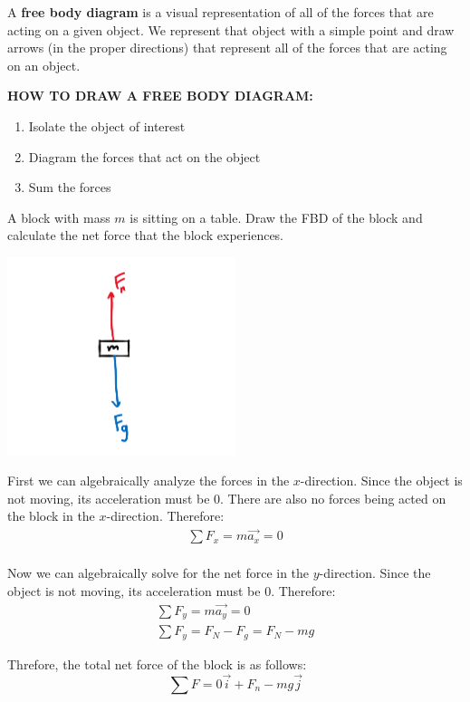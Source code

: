 A \textbf{free body diagram} is a visual representation of all of the forces that are acting on a given object. We represent that object with a simple point and draw arrows (in the proper directions) that represent all of the forces that are acting on an object.\\

\begin{center}\textbf{HOW TO DRAW A FREE BODY DIAGRAM:}\end{center}
\begin{enumerate}
	\item Isolate the object of interest
	\item Diagram the forces that act on the object
	\item Sum the forces
\end{enumerate}

\begin{problem}
	A block with mass $m$ is sitting on a table. Draw the FBD of the block and calculate the net force that the block experiences.

	\begin{center}
		\includegraphics[width=0.5\textwidth]{chapters/ch3/images/fig3_1.PNG}
	\end{center}
	First we can algebraically analyze the forces in the $x$-direction. Since the object is not moving, its acceleration must be 0. There are also no forces being acted on the block in the $x$-direction. Therefore:
	$$
		\begin{aligned}
			\sum F_x = m\vec{a_x} = 0\\
		\end{aligned}
	$$

	Now we can algebraically solve for the net force in the $y$-direction. Since the object is not moving, its acceleration must be 0. Therefore:
	$$
		\begin{aligned}
			\sum F_y = m\vec{a_y} = 0\\
			\sum F_y = F_N - F_g = F_N - mg
		\end{aligned}
	$$

	Threfore, the total net force of the block is as follows:
	$$
		\sum F = 0\vec{i} + F_n-mg \vec{j}
	$$
\end{problem}


